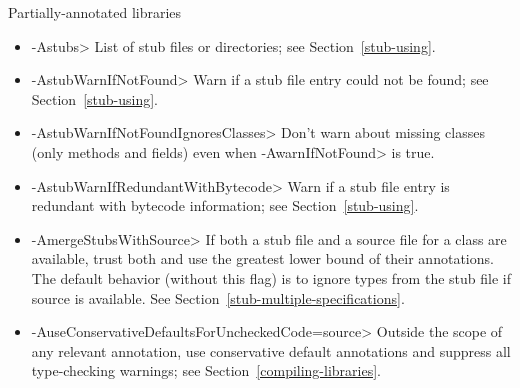 Partially-annotated libraries
\begin{itemize}
\item \<-Astubs>
  List of stub files or directories; see Section~\ref{stub-using}.
\item \<-AstubWarnIfNotFound>
  Warn if a stub file entry could not be found; see Section~\ref{stub-using}.
\item \<-AstubWarnIfNotFoundIgnoresClasses>
  Don't warn about missing classes (only methods and fields) even when \<-AwarnIfNotFound> is true.
\item \<-AstubWarnIfRedundantWithBytecode>
  Warn if a stub file entry is redundant with bytecode information; see
  Section~\ref{stub-using}.
\item \<-AmergeStubsWithSource>
  If both a stub file and a source file for a class are available, trust
  both and use the greatest lower bound of their annotations. The default
  behavior (without this flag) is to ignore types from the stub file if
  source is available. See Section~\ref{stub-multiple-specifications}.
\item \<-AuseConservativeDefaultsForUncheckedCode=source>
  Outside the scope of any relevant
   annotation, use conservative
  default annotations and suppress all type-checking warnings; see
  Section~\ref{compiling-libraries}.
\end{itemize}

